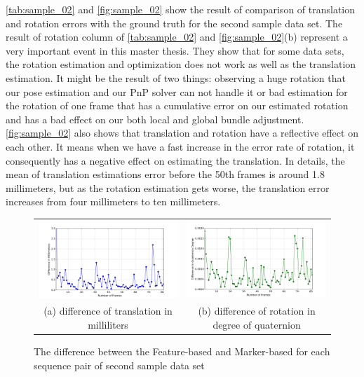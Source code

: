 \autoref{tab:sample_02} and \autoref{fig:sample_02} show the result of comparison of translation and rotation errors with the ground truth for the second sample data set. The result of rotation column of \autoref{tab:sample_02} and \autoref{fig:sample_02}(b) represent a very important event in this master thesis. They show that for some data sets, the rotation estimation and optimization does not work as well as the translation estimation. 
It might be the result of two things: observing a huge rotation that our pose estimation and our PnP solver can not handle it or bad estimation for the rotation of one frame that has a cumulative error on our estimated rotation and has a bad effect on our both local and global bundle adjustment.\autoref{fig:sample_02} also shows that translation and rotation have a reflective effect on each other. It means when we have a fast increase in the error rate of rotation, it consequently has a negative effect on estimating the translation. In details, the mean of translation estimations error before the 50th frames is around 1.8 millimeters, but as the rotation estimation gets worse, the translation error increases from four millimeters to ten millimeters.

\begin{figure}[H]
\begin{tabular}{cc}
  \includegraphics[width=80mm]{figures/diff_400/graph_translation} &  \includegraphics[width=80mm]{figures/diff_400/graph_rotation} \\
(a) difference of translation in milliliters & (b) difference of rotation in degree of quaternion \\[6pt]
\end{tabular}
\caption{The difference between the Feature-based and Marker-based for each sequence pair of second sample data set}\label{fig:sample_02_diff}
\end{figure}

